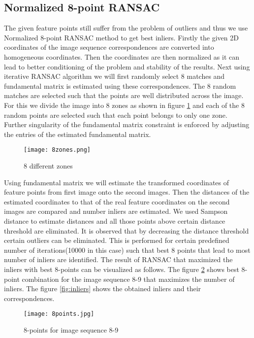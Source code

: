 \documentclass[11pt,twocolumn,pdftex]{article}
\begin{document}
\subsection{Normalized 8-point RANSAC} \label{RANSAC}
The given feature points still suffer from the problem of outliers and thus we use Normalized 8-point RANSAC method to get best inliers. Firstly the given 2D coordinates of the image sequence correspondences are converted into homogeneous coordinates. Then the coordinates are then normalized as it can lead to better conditioning of the problem and stability of the results. Next using iterative RANSAC algorithm we will first randomly select 8 matches and fundamental matrix is estimated using these correspondences. The 8 random matches are selected such that the points are well distributed across the image. For this we divide the image into 8 zones as shown in figure \ref{fig:8zones} and each of the 8 random points are selected such that each point belongs to only one zone. Further singularity of the fundamental matrix constraint is enforced by adjusting the entries of the estimated fundamental matrix.

\begin{figure}[h]
	\centering 
    \texttt{[image: 8zones.png]}
    \caption{8 different zones}
    \label{fig:8zones}
\end{figure}


Using fundamental matrix we will estimate the transformed coordinates of feature points from first image onto the second images. Then the distances of the estimated coordinates to that of the real feature coordinates on the second images are compared and number inliers are estimated. We used Sampson distance to estimate distances and all those points above certain distance threshold are eliminated. It is observed that by decreasing the distance threshold certain outliers can be eliminated. This is performed for certain predefined  number of iterations(10000 in this case) such that best 8 points that lead to most number of inliers are identified. The result of RANSAC that maximized the inliers with best 8-points can be visualized as follows. The figure \ref{fig:8points} shows best 8-point combination for the image sequence 8-9 that maximizes the number of inliers. The figure \ref{fig:inliers} shows the obtained inliers and their correspondences.


\begin{figure}[h]
	\centering 
    \texttt{[image: 8points.jpg]}
    \caption{8-points for image sequence 8-9}
    \label{fig:8points}
\end{figure}
\end{document}

